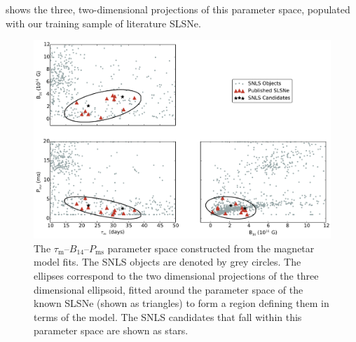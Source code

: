 \noindent {} shows the three, two-dimensional projections of this parameter space, populated with our training sample of literature SLSNe.

\begin{figure}
\includegraphics[scale=0.50]{Figures/Chapter3/SLAPparam}
\caption{The $\tau_\mathrm{m}$--$B_{14}$--$P_{\mathrm{ms}}$ parameter space constructed from the magnetar model fits. The SNLS objects are denoted by grey circles. The ellipses correspond to the two dimensional projections of the three dimensional ellipsoid, fitted around the parameter space of the known SLSNe (shown as triangles) to form a region defining them in terms of the model. The SNLS candidates that fall within this parameter space are shown as stars.}
\label{fig:SLAPparam}
\end{figure}

